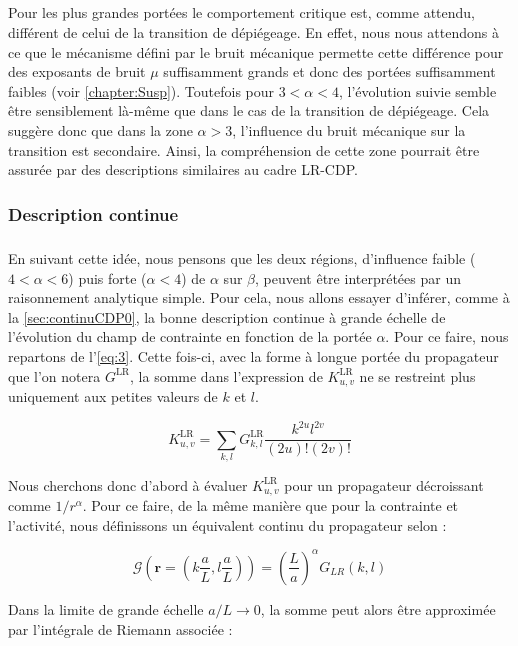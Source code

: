 \subparagraph{}Pour les plus grandes portées le comportement critique est, comme attendu, différent de celui de la transition de dépiégeage. En effet, nous nous attendons à ce que le mécanisme défini par le bruit mécanique permette cette différence pour des exposants de bruit $\mu$ suffisamment grands et donc des portées suffisamment faibles (voir \autoref{chapter:Susp}). Toutefois pour $3<\alpha<4$, l'évolution suivie semble être sensiblement là-même que dans le cas de la transition de dépiégeage. Cela suggère donc que dans la zone $\alpha > 3$, l'influence du bruit mécanique sur la transition est secondaire. Ainsi, la compréhension de cette zone pourrait être assurée par des descriptions similaires au cadre LR-CDP.

\subsubsection{Description continue}

\subparagraph{}En suivant cette idée, nous pensons que les deux régions, d'influence faible ($4<\alpha < 6$) puis forte ($\alpha < 4$) de $\alpha$ sur $\beta$, peuvent être interprétées par un raisonnement analytique simple. Pour cela, nous allons essayer d'inférer, comme à la \autoref{sec:continuCDP0}, la bonne description continue à grande échelle de l'évolution du champ de contrainte en fonction de la portée $\alpha$. Pour ce faire, nous repartons de l'\autoref{eq:3}. Cette fois-ci, avec la forme à longue portée du propagateur que l'on notera $G^\text{LR}$, la somme dans l'expression de $K^\text{LR}_{u,v}$ ne se restreint plus uniquement aux petites valeurs de $k$ et $l$. 

\begin{equation}
	K^\text{LR}_{u,v} = \sum_{k,l}G^\text{LR}_{k,l}\frac{k^{2u}l^{2v}}{(2u)!(2v)!}
	\label{eq:sommekuv}
\end{equation}

Nous cherchons donc d'abord à évaluer $K^\text{LR}_{u,v}$ pour un propagateur décroissant comme $1/r^\alpha$. Pour ce faire, de la même manière que pour la contrainte et l'activité, nous définissons un équivalent continu du propagateur selon :

\begin{equation}
    \mathcal{G}\left(\mathbf{r}=(k\frac{a}{L},l\frac{a}{L})\right) = \left(\frac{L}{a}\right)^\alpha G_{LR}(k,l)
    \label{eq:rescaled:propagator}
\end{equation}

\noindent Dans la limite de grande échelle $a/L \rightarrow 0$, la somme peut  alors être approximée par l'intégrale de Riemann associée :

